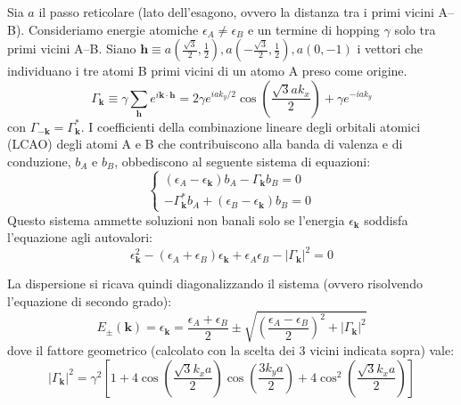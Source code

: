 Sia $a$ il passo reticolare (lato dell'esagono, ovvero la distanza tra i primi vicini A--B). Consideriamo energie atomiche $\epsilon_A \neq \epsilon_B$ e un termine di hopping $\gamma$ solo tra primi vicini A--B. Siano $\boldsymbol{h} \equiv a\left(\frac{\sqrt{3}}{2}, \frac{1}{2}\right), a\left(-\frac{\sqrt{3}}{2}, \frac{1}{2}\right), a(0, -1)$ i vettori che individuano i tre atomi B primi vicini di un atomo A preso come origine. 
\begin{equation*}
    \Gamma_{\boldsymbol{k}} \equiv \gamma \sum_{\boldsymbol{h}} e^{i\boldsymbol{k}\cdot\boldsymbol{h}} = 2\gamma e^{iak_y/2} \cos\left(\frac{\sqrt{3}ak_x}{2}\right) + \gamma e^{-iak_y}
\end{equation*}
con $\Gamma_{-\boldsymbol{k}} = \Gamma_{\boldsymbol{k}}^*$.  I coefficienti della combinazione lineare degli orbitali atomici (LCAO) degli atomi A e B che contribuiscono alla banda di valenza e di conduzione, $b_A$ e $b_B$, obbediscono al seguente sistema di equazioni:
\begin{equation*}
    \begin{cases}
        (\epsilon_A - \epsilon_{\boldsymbol{k}}) b_A - \Gamma_{\boldsymbol{k}} b_B = 0 \\[1ex]
        -\Gamma_{\boldsymbol{k}}^* b_A + (\epsilon_B - \epsilon_{\boldsymbol{k}}) b_B = 0
    \end{cases}
\end{equation*}
Questo sistema ammette soluzioni non banali solo se l'energia $\epsilon_{\boldsymbol{k}}$ soddisfa l'equazione agli autovalori:
\begin{equation*}
    \epsilon_{\boldsymbol{k}}^2 - (\epsilon_A + \epsilon_B)\epsilon_{\boldsymbol{k}} + \epsilon_A\epsilon_B - |\Gamma_{\boldsymbol{k}}|^2 = 0
\end{equation*}

La dispersione si ricava quindi diagonalizzando il sistema (ovvero risolvendo l'equazione di secondo grado):
\begin{equation*}
    E_\pm(\boldsymbol{k}) = \epsilon_{\boldsymbol{k}} = \frac{\epsilon_A+\epsilon_B}{2} \pm \sqrt{\left(\frac{\epsilon_A-\epsilon_B}{2}\right)^2 + |\Gamma_{\boldsymbol{k}}|^2}
\end{equation*}
dove il fattore geometrico (calcolato con la scelta dei 3 vicini indicata sopra) vale:
\begin{equation*}
    |\Gamma_{\boldsymbol{k}}|^2 = \gamma^2\left[1 + 4\cos\left(\frac{\sqrt{3} k_xa}{2}\right)\cos\left(\frac{3k_ya}{2}\right) + 4\cos^2\left(\frac{\sqrt{3} k_xa}{2}\right)\right]
\end{equation*} 

